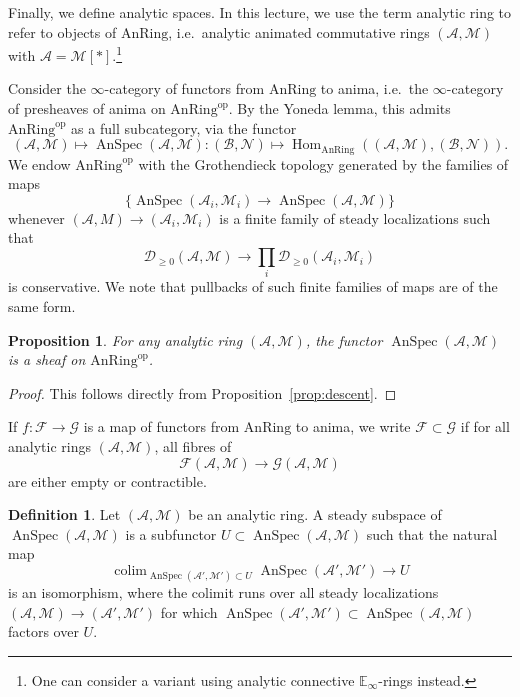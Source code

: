 \documentclass[11pt]{amsbook}
\DeclareMathOperator{\Hom}{Hom}
\newcommand{\AnRing}{{\mathrm{AnRing}}}
\DeclareMathOperator{\AnSpec}{AnSpec}
\DeclareMathOperator{\colim}{colim}
\numberwithin{equation}{section}
\numberwithin{theorem}{section}
\newtheorem{proposition}[theorem]{Proposition}
\theoremstyle{definition}
\newtheorem{definition}[theorem]{Definition}
\begin{document}
Finally, we define analytic spaces. In this lecture, we use the term analytic ring to refer to objects of $\AnRing$, i.e.~analytic animated commutative rings $(\mathcal A,\mathcal M)$ with $\mathcal A = \mathcal M[\ast]$.\footnote{One can consider a variant using analytic connective $\mathbb E_\infty$-rings instead.}

Consider the $\infty$-category of functors from $\AnRing$ to anima, i.e.~the $\infty$-category of presheaves of anima on $\AnRing^{\mathrm{op}}$. By the Yoneda lemma, this admits $\AnRing^{\mathrm{op}}$ as a full subcategory, via the functor
\[
(\mathcal A,\mathcal M)\mapsto \AnSpec(\mathcal A,\mathcal M) : (\mathcal B,\mathcal N)\mapsto \Hom_\AnRing((\mathcal A,\mathcal M),(\mathcal B,\mathcal N)).
\]
We endow $\AnRing^{\mathrm{op}}$ with the Grothendieck topology generated by the families of maps
\[
\{\AnSpec(\mathcal A_i,\mathcal M_i)\to \AnSpec(\mathcal A,\mathcal M)\}
\]
whenever $(\mathcal A,M)\to (\mathcal A_i,\mathcal M_i)$ is a finite family of steady localizations such that
\[
\mathcal D_{\geq 0}(\mathcal A,\mathcal M)\to \prod_i \mathcal D_{\geq 0}(\mathcal A_i,\mathcal M_i)
\]
is conservative. We note that pullbacks of such finite families of maps are of the same form.

\begin{proposition} For any analytic ring $(\mathcal A,\mathcal M)$, the functor $\AnSpec(\mathcal A,\mathcal M)$ is a sheaf on $\AnRing^{\mathrm{op}}$.
\end{proposition}

\begin{proof} This follows directly from Proposition~\ref{prop:descent}.
\end{proof}

If $f: \mathcal F\to \mathcal G$ is a map of functors from $\AnRing$ to anima, we write $\mathcal F\subset \mathcal G$ if for all analytic rings $(\mathcal A,\mathcal M)$, all fibres of
\[
\mathcal F(\mathcal A,\mathcal M)\to \mathcal G(\mathcal A,\mathcal M)
\]
are either empty or contractible.

\begin{definition} Let $(\mathcal A,\mathcal M)$ be an analytic ring. A steady subspace of $\AnSpec(\mathcal A,\mathcal M)$ is a subfunctor $U\subset \AnSpec(\mathcal A,\mathcal M)$ such that the natural map
\[
\colim_{\AnSpec(\mathcal A',\mathcal M')\subset U} \AnSpec(\mathcal A',\mathcal M')\to U
\]
is an isomorphism, where the colimit runs over all steady localizations $(\mathcal A,\mathcal M)\to (\mathcal A',\mathcal M')$ for which $\AnSpec(\mathcal A',\mathcal M')\subset \AnSpec(\mathcal A,\mathcal M)$ factors over $U$.
\end{definition}
\end{document}
